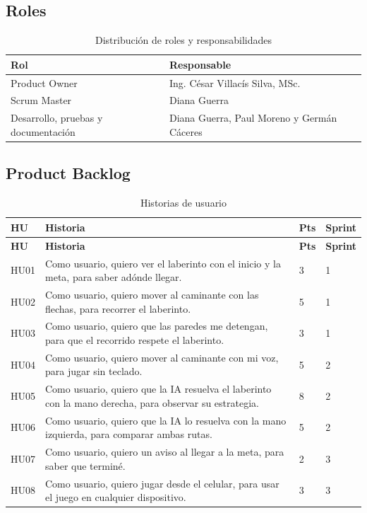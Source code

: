 \documentclass[12pt,a4paper]{article}
\begin{document}
\subsection{Roles}
\begin{table}[H]
\centering
\caption{Distribución de roles y responsabilidades}
\begin{tabular}{ll}
\toprule
\textbf{Rol} & \textbf{Responsable}\\
\midrule
Product Owner & Ing. César Villacís Silva, MSc.\\
Scrum Master & Diana Guerra\\
Desarrollo, pruebas y documentación & Diana Guerra, Paul Moreno y Germán Cáceres\\
\bottomrule
\end{tabular}
\end{table}

\subsection{Product Backlog}
\begin{longtable}{p{1.1cm}p{8.6cm}p{1.2cm}p{1.6cm}}
\caption{Historias de usuario}\\
\toprule
\textbf{HU} & \textbf{Historia} & \textbf{Pts} & \textbf{Sprint}\\
\midrule\endfirsthead
\toprule
\textbf{HU} & \textbf{Historia} & \textbf{Pts} & \textbf{Sprint}\\
\midrule\endhead
HU01 & Como usuario, quiero ver el laberinto con el inicio y la meta, para saber adónde llegar. & 3 & 1\\
HU02 & Como usuario, quiero mover al caminante con las flechas, para recorrer el laberinto. & 5 & 1\\
HU03 & Como usuario, quiero que las paredes me detengan, para que el recorrido respete el laberinto. & 3 & 1\\
HU04 & Como usuario, quiero mover al caminante con mi voz, para jugar sin teclado. & 5 & 2\\
HU05 & Como usuario, quiero que la IA resuelva el laberinto con la mano derecha, para observar su estrategia. & 8 & 2\\
HU06 & Como usuario, quiero que la IA lo resuelva con la mano izquierda, para comparar ambas rutas. & 5 & 2\\
HU07 & Como usuario, quiero un aviso al llegar a la meta, para saber que terminé. & 2 & 3\\
HU08 & Como usuario, quiero jugar desde el celular, para usar el juego en cualquier dispositivo. & 3 & 3\\
\bottomrule
\end{longtable}
\end{document}
